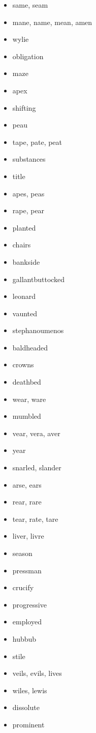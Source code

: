 \documentclass{article}
\begin{document}
\begin{itemize}
    \item same, seam
    \item mane, name, mean, amen
    \item wylie
    \item obligation
    \item maze
    \item apex
    \item shifting
    \item peau
    \item tape, pate, peat
    \item substances
    \item title
    \item apes, peas
    \item rape, pear
    \item planted
    \item chairs
    \item bankside
    \item gallantbuttocked
    \item leonard
    \item vaunted
    \item stephanoumenos
    \item baldheaded
    \item crowns
    \item deathbed
    \item wear, ware
    \item mumbled
    \item vear, vera, aver
    \item year
    \item snarled, slander
    \item arse, ears
    \item rear, rare
    \item tear, rate, tare
    \item liver, livre
    \item season
    \item pressman
    \item crucify
    \item progressive
    \item employed
    \item hubbub
    \item stile
    \item veils, evils, lives
    \item wiles, lewis
    \item dissolute
    \item prominent

\end{itemize}
\end{document}
